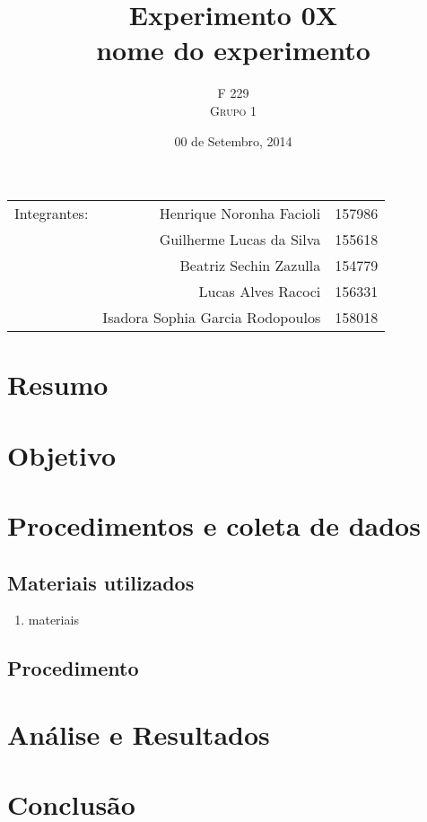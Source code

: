 \documentclass[a4paper]{article} %
\title{Experimento 0X \\ nome do experimento}
\author{F 229 \\ \textsc{Grupo 1}}
\date{00 de Setembro, 2014}
\begin{document}
\maketitle

\begin{center}
	\begin{tabular}{l r l}
		Integrantes: & Henrique Noronha Facioli & 157986 \\
		& Guilherme Lucas da Silva & 155618 \\
		& Beatriz Sechin Zazulla & 154779 \\
		& Lucas Alves Racoci & 156331 \\
		& Isadora Sophia Garcia Rodopoulos & 158018 \\
	\end{tabular}
\end{center}


\section{Resumo} 

\section{Objetivo}

\section{Procedimentos e coleta de dados}

 \subsection{Materiais utilizados}

\begin{enumerate} 
	\item materiais
\end{enumerate} 
 
 \subsection{Procedimento}
 
\section{Análise e Resultados}

\section{Conclusão}
\end{document}
